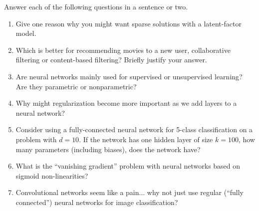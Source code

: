 \documentclass{article}
\newcommand{\blu}[1]{{\textcolor{blu}{#1}}}
\let\ask\blu
\begin{document}
\ask{Answer each of the following questions in a sentence or two.}
\begin{enumerate}

\item Give one reason why you might want sparse solutions with a latent-factor model.


\item Which is better for recommending movies to a new user, collaborative filtering or content-based filtering? Briefly justify your answer.


\item{Are neural networks mainly used for supervised or unsupervised learning? Are they parametric or nonparametric?}

\item{Why might regularization become more important as we add layers to a neural network?}


\item{Consider using a fully-connected neural network for 5-class classification on a problem with $d=10$. If the network has one hidden layer of size $k=100$, how many parameters (including biases), does the network have?}


\item What is the ``vanishing gradient'' problem with neural networks based on sigmoid non-linearities?

\item{Convolutional networks seem like a pain... why not just use regular (``fully connected'') neural networks for image classification?}

\end{enumerate}
\end{document}
